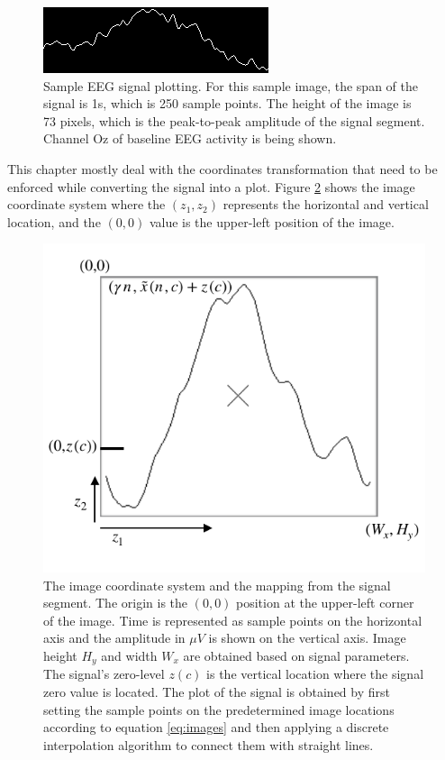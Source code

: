 \begin{figure}[]
\centering
\includegraphics[scale=1.5]{images/plottingsample.png}
\caption[EEG Signal Mapping to Images]{Sample EEG signal plotting.  For this sample image, the span of the signal is 1s, which is 250 sample points.  The height of the image is 73 pixels, which is the peak-to-peak amplitude of the signal segment.  Channel Oz of baseline EEG activity is being shown.}
\label{fig:plottingsample}
\end{figure}

This chapter mostly deal with the coordinates transformation that need to be enforced while converting the signal into a plot.  Figure \ref{fig:imagecoordinatesystem} shows the image coordinate system where the $(z_1,z_2)$ represents the horizontal and vertical location, and the $(0,0)$ value is the upper-left position of the image.

\begin{figure}[]
\centering
\includegraphics[scale=1]{images/imagecoordinatesystem.pdf}
\caption[Image Coordinate System]{The image coordinate system and the mapping from the signal segment.  The origin is the $(0,0)$ position at the upper-left corner of the image.  Time is represented as sample points on the horizontal axis and the amplitude in $\mu V$ is shown on the vertical axis. Image height $H_y$ and width $W_x$ are obtained based on signal parameters.  The signal's zero-level $z(c)$ is the vertical location where the signal zero value is located. The plot of the signal is obtained by first setting the sample points on the predetermined image locations according to equation \ref{eq:images} and then applying a discrete interpolation algorithm to connect them with straight lines. }
\label{fig:imagecoordinatesystem}
\end{figure}

